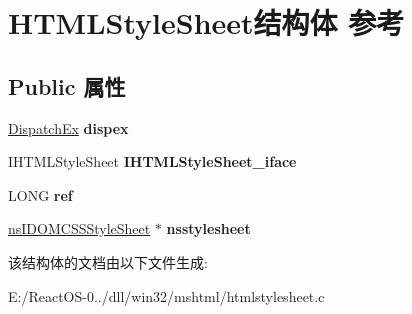 \hypertarget{struct_h_t_m_l_style_sheet}{}\section{H\+T\+M\+L\+Style\+Sheet结构体 参考}
\label{struct_h_t_m_l_style_sheet}
\subsection*{Public 属性}
\begin{DoxyCompactItemize}
\item 
\mbox{\label{struct_h_t_m_l_style_sheet_a5be0f18cc6c479f3362c74c940e6dd8c}} 
\hyperlink{struct_dispatch_ex}{Dispatch\+Ex} {\bfseries dispex}
\item 
\mbox{\label{struct_h_t_m_l_style_sheet_abea299627e83229a1236a6230039b6ab}} 
I\+H\+T\+M\+L\+Style\+Sheet {\bfseries I\+H\+T\+M\+L\+Style\+Sheet\+\_\+iface}
\item 
\mbox{\label{struct_h_t_m_l_style_sheet_a25eb195360b1bd785b5400f82f0e2b0b}} 
L\+O\+NG {\bfseries ref}
\item 
\mbox{\label{struct_h_t_m_l_style_sheet_a3dc8525dcfcc58a97a424891343a0af9}} 
\hyperlink{interfacens_i_d_o_m_c_s_s_style_sheet}{ns\+I\+D\+O\+M\+C\+S\+S\+Style\+Sheet} $\ast$ {\bfseries nsstylesheet}
\end{DoxyCompactItemize}


该结构体的文档由以下文件生成\+:\begin{DoxyCompactItemize}
\item 
E\+:/\+React\+O\+S-\/0../dll/win32/mshtml/htmlstylesheet.\+c\end{DoxyCompactItemize}
